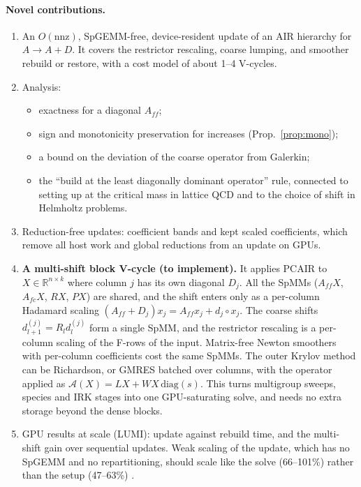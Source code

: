 \documentclass[11pt,a4paper]{article}
\newcommand{\Aff}{A_{ff}}
\begin{document}
\paragraph{Novel contributions.}
\begin{enumerate}
\item An $O(\mathrm{nnz})$, SpGEMM-free, device-resident update of an AIR hierarchy for $A\to A+D$. It covers the restrictor rescaling, coarse lumping, and smoother rebuild or restore, with a cost model of about 1--4 V-cycles.
\item Analysis:
  \begin{itemize}
  \item exactness for a diagonal $\Aff$;
  \item sign and monotonicity preservation for increases (Prop.~\ref{prop:mono});
  \item a bound on the deviation of the coarse operator from Galerkin;
  \item the ``build at the least diagonally dominant operator'' rule, connected to setting up at the critical mass in lattice QCD and to the choice of shift in Helmholtz problems.
  \end{itemize}
\item Reduction-free updates: coefficient bands and kept scaled coefficients, which remove all host work and global reductions from an update on GPUs.
\item \textbf{A multi-shift block V-cycle (to implement).} It applies PCAIR to $X\in\mathbb R^{n\times k}$ where column $j$ has its own diagonal $D_j$. All the SpMMs ($\Aff X$, $A_{fc}X$, $RX$, $PX$) are shared, and the shift enters only as a per-column Hadamard scaling $(\Aff+D_j)x_j=\Aff x_j+d_j\circ x_j$. The coarse shifts $d^{(j)}_{l+1}=R_l d^{(j)}_l$ form a single SpMM, and the restrictor rescaling is a per-column scaling of the F-rows of the input. Matrix-free Newton smoothers with per-column coefficients cost the same SpMMs. The outer Krylov method can be Richardson, or GMRES batched over columns, with the operator applied as $\mathcal A(X)=LX+W X\,\mathrm{diag}(s)$. This turns multigroup sweeps, species and IRK stages into one GPU-saturating solve, and needs no extra storage beyond the dense blocks.
\item GPU results at scale (LUMI): update against rebuild time, and the multi-shift gain over sequential updates. Weak scaling of the update, which has no SpGEMM and no repartitioning, should scale like the solve (66--101\%) rather than the setup (47--63\%) \cite{Darg26}.
\end{enumerate}
\end{document}
